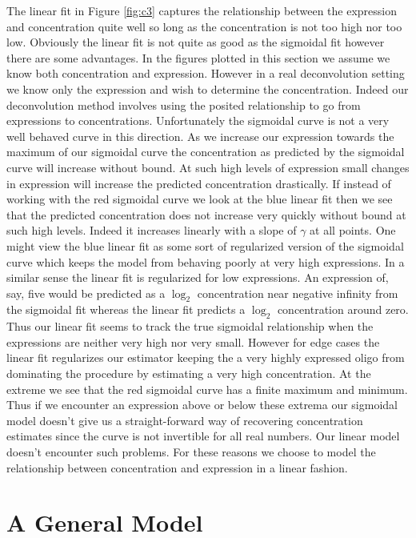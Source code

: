 \documentclass[reqno,12pt,oneside]{report}\usepackage[]{graphicx}\usepackage[]{color}
\theoremstyle{plain}
\theoremstyle{definition}
\theoremstyle{remark}
\numberwithin{theorem}{chapter}     %
\begin{document}
The linear fit in Figure \ref{fig:c3} captures the relationship between the expression and concentration quite well so long as the concentration is not too high nor too low. Obviously the linear fit is not quite as good as the sigmoidal fit however there are some advantages. In the figures plotted in this section we assume we know both concentration and expression. However in a real deconvolution setting we know only the expression and wish to determine the concentration. Indeed our deconvolution method involves using the posited relationship to go from expressions to concentrations. Unfortunately the sigmoidal curve is not a very well behaved curve in this direction. As we increase our expression towards the maximum of our sigmoidal curve the concentration as predicted by the sigmoidal curve will increase without bound. At such high levels of expression small changes in expression will increase the predicted concentration drastically. If instead of working with the red sigmoidal curve we look at the blue linear fit then we see that the predicted concentration does not increase very quickly without bound at such high levels. Indeed it increases linearly with a slope of $\gamma$ at all points. One might view the blue linear fit as some sort of regularized version of the sigmoidal curve which keeps the model from behaving poorly at very high expressions. In a similar sense the linear fit is regularized for low expressions. An expression of, say, five would be predicted as a $\log_2$ concentration near negative infinity from the sigmoidal fit whereas the linear fit predicts a $\log_2$ concentration around zero. Thus our linear fit seems to track the true sigmoidal relationship when the expressions are neither very high nor very small. However for edge cases the linear fit regularizes our estimator keeping the a very highly expressed oligo from dominating the procedure by estimating a very high concentration. At the extreme we see that the red sigmoidal curve has a finite maximum and minimum. Thus if we encounter an expression above or below these extrema our sigmoidal model doesn't give us a straight-forward way of recovering concentration estimates since the curve is not invertible for all real numbers. Our linear model doesn't encounter such problems. For these reasons we choose to model the relationship between concentration and expression in a linear fashion. 
  
\section{A General Model}
\end{document}
